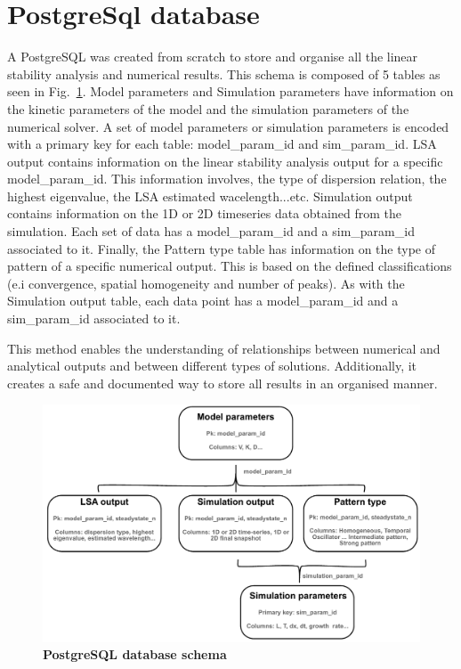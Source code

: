 \section{PostgreSql database}\label{PostgreSql database}
A PostgreSQL was created from scratch to store and organise all the linear stability analysis and numerical results.
This schema is composed of 5 tables as seen in Fig.~\ref{psql_schema}.
Model parameters and Simulation parameters have information on the kinetic parameters of the model and the simulation parameters of the numerical solver.
A set of model parameters or simulation parameters is encoded with a primary key for each table: model\_param\_id and sim\_param\_id.
LSA output contains information on the linear stability analysis output for a specific model\_param\_id.
This information involves, the type of dispersion relation, the highest eigenvalue, the LSA estimated wacelength...etc.
Simulation output contains information on the 1D or 2D timeseries data obtained from the simulation. Each set of data has a model\_param\_id and a sim\_param\_id associated to it.
Finally, the Pattern type table has information on the type of pattern of a specific numerical output.
This is based on the defined classifications (e.i convergence, spatial homogeneity and number of peaks).
As with the Simulation output table, each data point has a model\_param\_id and a sim\_param\_id associated to it.

This method enables the understanding of relationships between numerical and analytical outputs and between different types of solutions.
Additionally, it creates a safe and documented way to store all results in an organised manner.

\begin{figure}[H]

    \includegraphics[width=1\textwidth]{chapters/Methods/psql_schema}
    \caption{\textbf{PostgreSQL database schema}}
    \label{psql_schema}
\end{figure}

